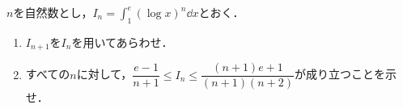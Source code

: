 \documentclass[../../main.tex]{subfiles}
\begin{document}
$n$を自然数とし，${\displaystyle I_n=\int_{1}^{e}\left(\log x\right)^n \dd x}$とおく．
\begin{enumerate}
  \item $I_{n+1}$を$I_n$を用いてあらわせ．
  \item すべての$n$に対して，$\dfrac{e-1}{n+1}\le I_n \le \dfrac{(n+1)e+1}{(n+1)(n+2)}$が成り立つことを示せ．
\end{enumerate}
\end{document}
